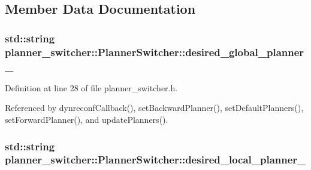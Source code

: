 \subsection{Member Data Documentation}
\subsubsection[{\texorpdfstring{desired\+\_\+global\+\_\+planner\+\_\+}{desired_global_planner_}}]{\setlength{\rightskip}{0pt plus 5cm}std\+::string planner\+\_\+switcher\+::\+Planner\+Switcher\+::desired\+\_\+global\+\_\+planner\+\_\+\hspace{0.3cm}{\ttfamily [private]}}\hypertarget{classplanner__switcher_1_1PlannerSwitcher_a5366081108ad08665549439b00902c58}{}\label{classplanner__switcher_1_1PlannerSwitcher_a5366081108ad08665549439b00902c58}


Definition at line 28 of file planner\+\_\+switcher.\+h.



Referenced by dynreconf\+Callback(), set\+Backward\+Planner(), set\+Default\+Planners(), set\+Forward\+Planner(), and update\+Planners().

\subsubsection[{\texorpdfstring{desired\+\_\+local\+\_\+planner\+\_\+}{desired_local_planner_}}]{\setlength{\rightskip}{0pt plus 5cm}std\+::string planner\+\_\+switcher\+::\+Planner\+Switcher\+::desired\+\_\+local\+\_\+planner\+\_\+\hspace{0.3cm}{\ttfamily [private]}}\hypertarget{classplanner__switcher_1_1PlannerSwitcher_a112b2460ae1846c796d66d77288b6104}{}\label{classplanner__switcher_1_1PlannerSwitcher_a112b2460ae1846c796d66d77288b6104}


